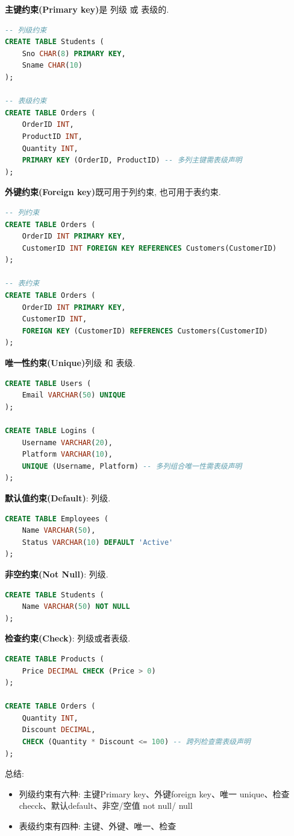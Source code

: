 \textbf{主键约束(Primary key)}是 列级 或 表级的.
\begin{lstlisting}[language=SQL]
-- 列级约束
CREATE TABLE Students (
    Sno CHAR(8) PRIMARY KEY,
    Sname CHAR(10)
);

-- 表级约束
CREATE TABLE Orders (
    OrderID INT,
    ProductID INT,
    Quantity INT,
    PRIMARY KEY (OrderID, ProductID) -- 多列主键需表级声明
);
\end{lstlisting}

\textbf{外键约束(Foreign key)}既可用于列约束, 也可用于表约束.
\begin{lstlisting}[language=SQL]
-- 列约束
CREATE TABLE Orders (
    OrderID INT PRIMARY KEY,
    CustomerID INT FOREIGN KEY REFERENCES Customers(CustomerID)
);

-- 表约束
CREATE TABLE Orders (
    OrderID INT PRIMARY KEY,
    CustomerID INT,
    FOREIGN KEY (CustomerID) REFERENCES Customers(CustomerID)
);
\end{lstlisting}

\textbf{唯一性约束(Unique)}列级 和 表级.
\begin{lstlisting}[language=SQL]
CREATE TABLE Users (
    Email VARCHAR(50) UNIQUE
);

CREATE TABLE Logins (
    Username VARCHAR(20),
    Platform VARCHAR(10),
    UNIQUE (Username, Platform) -- 多列组合唯一性需表级声明
);
\end{lstlisting}

\textbf{默认值约束(Default)}: 列级.
\begin{lstlisting}[language=SQL]
CREATE TABLE Employees (
    Name VARCHAR(50),
    Status VARCHAR(10) DEFAULT 'Active'
);
\end{lstlisting}

\textbf{非空约束(Not Null)}: 列级.
\begin{lstlisting}[language=SQL]
CREATE TABLE Students (
    Name VARCHAR(50) NOT NULL
);
\end{lstlisting}

\textbf{检查约束(Check)}: 列级或者表级.
\begin{lstlisting}[language=SQL]
CREATE TABLE Products (
    Price DECIMAL CHECK (Price > 0)
);

CREATE TABLE Orders (
    Quantity INT,
    Discount DECIMAL,
    CHECK (Quantity * Discount <= 100) -- 跨列检查需表级声明
);
\end{lstlisting}

总结:
\begin{itemize}
    \item 列级约束有六种: 主键Primary key、外键foreign key、唯一 unique、检查 checck、默认default、非空/空值 not null/ null
    \item 表级约束有四种: 主键、外键、唯一、检查
\end{itemize}

